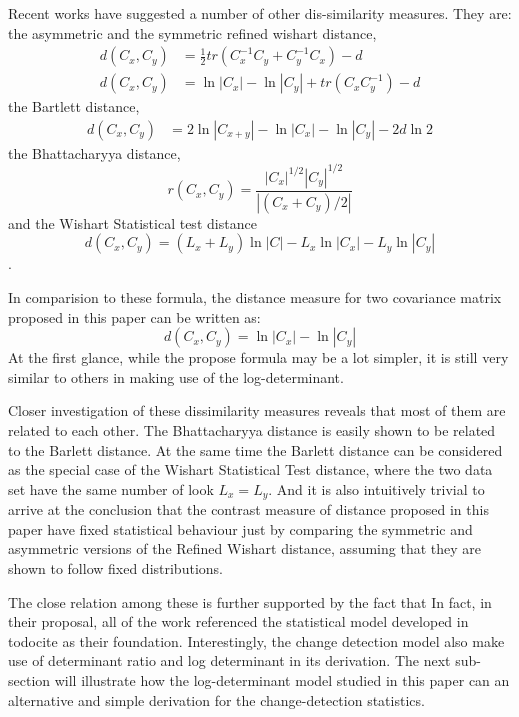 \documentclass[journal]{IEEEtran}
\begin{document}
Recent works have suggested a number of other dis-similarity measures.
They are: the asymmetric and the symmetric refined wishart distance\cite{Anfinsen_2007_ESA_POLINSAR},
\begin{align}
  d(C_x,C_y) &= \frac{1}{2} tr(C_x^{-1}C_y + C_y^{-1}C_x) - d \\
    d(C_x,C_y) &= \ln|C_x| - \ln|C_y| + tr(C_xC_y^{-1}) - d
\end{align}
the Bartlett distance\cite{Kersten_2005_TGRS_519},
  \begin{align}
  d(C_x,C_y) &= 2 \ln |C_{x+y}| - \ln |C_x| - \ln |C_y| - 2d\ln2
  \end{align}
the Bhattacharyya distance\cite{Lee_2011_IGARSS_3740},
\begin{equation}
  r(C_x,C_y) = \frac{|C_x|^{1/2} |C_y|^{1/2}}{|(C_x+C_y)/2|}
\end{equation}
and the Wishart Statistical test distance\cite{Cao_2007_TGRS_3454}
\begin{equation}
  d(C_x,C_y) = (L_x + L_y) \ln|C| - L_x \ln|C_x| - L_y\ln|C_y|
\end{equation}
.

In comparision to these formula, the distance measure for two covariance matrix proposed in this paper can be written as:
\begin{equation}
  d(C_x,C_y) =  \ln|C_x| - \ln|C_y| 
\end{equation}
At the first glance, while the propose formula may be a lot simpler, it is still very similar to others in making use of the log-determinant.

Closer investigation of these dissimilarity measures reveals that most of them are related to each other.
The Bhattacharyya distance is easily shown to be related to the Barlett distance.
At the same time the Barlett distance can be considered as the special case of the Wishart Statistical Test distance, where the two data set have the same number of look $L_x=L_y$.
And it is also intuitively trivial to arrive at the conclusion that the contrast measure of distance proposed in this paper have fixed statistical behaviour just by comparing the symmetric and asymmetric versions of the Refined Wishart distance, assuming that they are shown to follow fixed distributions.

The close relation among these is further supported by the fact that
In fact, in their proposal, all of the work referenced the statistical model developed in todocite as their foundation.
Interestingly, the change detection model also make use of determinant ratio and log determinant in its derivation.  
The next sub-section will illustrate how the log-determinant model studied in this paper can an alternative and simple derivation for the change-detection statistics.
 
\end{document}
